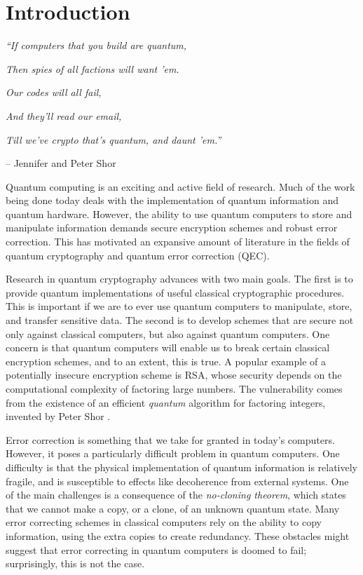 \chapter{Introduction}
\label{introduction}


\textit{``If computers that you build are quantum,}

\textit{Then spies of all factions will want 'em.}

\textit{Our codes will all fail,}

\textit{And they'll read our email,}

\textit{Till we've crypto that's quantum, and daunt 'em.''}

\quad -- Jennifer and Peter Shor

Quantum computing is an exciting and active field of research. Much of the work being done today deals with the implementation of quantum information and quantum hardware. However, the ability to use quantum computers to store and manipulate information demands secure encryption schemes and robust error correction. This has motivated an expansive amount of literature in the fields of quantum cryptography and quantum error correction (QEC). 

Research in quantum cryptography advances with two main goals. The first is to provide quantum implementations of useful classical cryptographic procedures. This is important if we are to ever use quantum computers to manipulate, store, and transfer sensitive data. The second is to develop schemes that are secure not only against classical computers, but also against quantum computers. One concern is that quantum computers will enable us to break certain classical encryption schemes, and to an extent, this is true. A popular example of a potentially insecure encryption scheme is RSA, whose security depends on the computational complexity of factoring large numbers. The vulnerability comes from the existence of an efficient \textit{quantum} algorithm for factoring integers, invented by Peter Shor \cite{Shor_1997}. 

Error correction is something that we take for granted in today's computers. However, it poses a particularly difficult problem in quantum computers. One difficulty is that the physical implementation of quantum information is relatively fragile, and is susceptible to effects like decoherence from external systems. One of the main challenges is a consequence of the \textit{no-cloning theorem}, which states that we cannot make a copy, or a clone, of an unknown quantum state. Many error correcting schemes in classical computers rely on the ability to copy information, using the extra copies to create redundancy. These obstacles might suggest that error correcting in quantum computers is doomed to fail; surprisingly, this is not the case.

